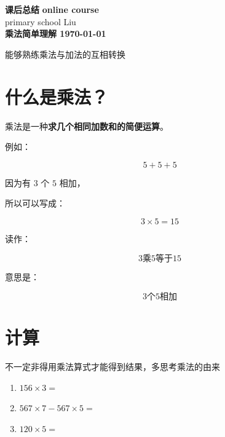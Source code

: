 \documentclass[DIN, pagenumber=false, fontsize=11pt, parskip=half]{scrartcl}
\newcommand{\mytitle}[1]{{\noindent\Large\textbf{#1}}}
\begin{document}
\noindent\textbf{课后总结} \hfill \textbf{online course}\\
primary school \hfill Liu\\

\mytitle{乘法简单理解 \hfill \today}
\newline
\begin{parchmentquote}
  能够熟练乘法与加法的互相转换

\end{parchmentquote}


\section{什么是乘法？}

乘法是一种\textbf{求几个相同加数和的简便运算}。

例如：

\[
5+5+5
\]

因为有 $3$ 个 $5$ 相加，

所以可以写成：

\[
3\times5=15
\]

读作：

\[
3\text{乘}5\text{等于}15
\]

意思是：

\[
\boxed{\text{3个5相加}}
\]
\section{计算}
\begin{parchmentquote}
 不一定非得用乘法算式才能得到结果，多思考乘法的由来

\end{parchmentquote}
\begin{enumerate}
    \item $156 \times 3 = $
    \item $567 \times 7 - 567 \times 5 = $
    \item $120 \times 5 = $

\end{enumerate}
\end{document}
